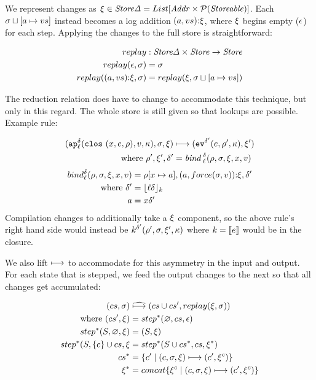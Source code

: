 \documentclass[preprint,onecolumn,9pt]{sigplanconf} %
\begin{document}
We represent changes as $\msdiff \in \StoreDelta = List[\Addr \times
  \Set(\Storeable)]$. Each $\msto\sqcup[\maddr \mapsto \mval{s}]$
instead becomes a log addition
$\cons{\ttuple{\maddr}{\mval{s}}}{\msdiff}$, where $\msdiff$ begins
empty ($\mtlst$) for each step. Applying the changes to the full store
is straightforward:

\begin{align*}
replay &: \StoreDelta \times \Store \to \Store \\
replay(\mtlst, \msto) &= \msto \\
replay(\cons{\ttuple{\maddr}{\mval{s}}}{\msdiff}, \msto) &= replay(\msdiff, \msto\sqcup[\maddr \mapsto \mval{s}])
\end{align*}

The reduction relation does have to change to accommodate this
technique, but only in this regard. The whole store is still given so
that lookups are possible. Example rule:

\begin{align*}
(\ap[^\mcntr_\mlab]{\clos{\mvar,\mexp,\menv},\mval,\mkont},\msto,\msdiff) & \machstep
(\ev[^{\mcntr'}]{\mexp,\menv',\mkont},\msdiff') \\
\text{ where }\menv',\msdiff',\mcntr' &= \mathit{bind\,}^{ \mcntr}_\mlab(\menv,\msto,\msdiff,\mvar,\mval)
\end{align*}
\begin{align*}
bind^{\mcntr}_\mlab(\menv, \msto, \msdiff, \mvar, \mval) &= \menv[\mvar \mapsto \maddr], \cons{\ttuple{\maddr}{force(\msto,\mval)}}{\msdiff}, \mcntr' \\
\text{ where } \mcntr' &= \lfloor \mlab \mcntr\rfloor_k \\
               \maddr &= \mvar\mcntr'
\end{align*}
Compilation changes to additionally take a $\msdiff$ component, so the
above rule's right hand side would instead be $k^{\mcntr'}(\menv',
\msto, \msdiff', \mkont)$ where $k = \compile{e}$ would be in the closure.

We also lift $\machstep$ to accommodate for this asymmetry
in the input and output. For each state that is stepped, we feed the
output changes to the next so that all changes get accumulated:

\begin{align*}
(cs, \msto) &\mathrel{\widehat{\machstep}} (cs\cup cs', replay(\msdiff,\msto)) \\
\mbox{ where } (cs', \msdiff) &= step^*(\varnothing, cs, \mtlst) \\
step^*(S, \varnothing, \msdiff) &= (S, \msdiff) \\
step^*(S, \{c\}\cup cs, \msdiff &= step^*(S\cup cs^*, cs, \msdiff^*) \\
cs^* &= \{c' \mid (c,\msto,\msdiff) \machstep (c',\msdiff^c) \} \\
\msdiff^* &= concat\{\msdiff^c \mid (c, \msto,\msdiff) \machstep (c', \msdiff^c)\}
\end{align*}
\end{document}
